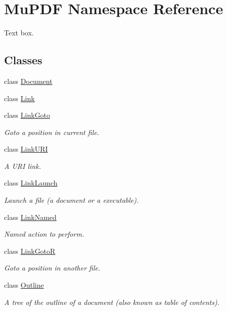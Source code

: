 \hypertarget{namespace_mu_p_d_f}{\section{Mu\-P\-D\-F Namespace Reference}
\label{namespace_mu_p_d_f}
}


Text box.  


\subsection*{Classes}
\begin{DoxyCompactItemize}
\item 
class \hyperlink{class_mu_p_d_f_1_1_document}{Document}
\item 
class \hyperlink{class_mu_p_d_f_1_1_link}{Link}
\item 
class \hyperlink{class_mu_p_d_f_1_1_link_goto}{Link\-Goto}
\begin{DoxyCompactList}\small\item\em Goto a position in current file. \end{DoxyCompactList}\item 
class \hyperlink{class_mu_p_d_f_1_1_link_u_r_i}{Link\-U\-R\-I}
\begin{DoxyCompactList}\small\item\em A U\-R\-I link. \end{DoxyCompactList}\item 
class \hyperlink{class_mu_p_d_f_1_1_link_launch}{Link\-Launch}
\begin{DoxyCompactList}\small\item\em Launch a file (a document or a executable). \end{DoxyCompactList}\item 
class \hyperlink{class_mu_p_d_f_1_1_link_named}{Link\-Named}
\begin{DoxyCompactList}\small\item\em Named action to perform. \end{DoxyCompactList}\item 
class \hyperlink{class_mu_p_d_f_1_1_link_goto_r}{Link\-Goto\-R}
\begin{DoxyCompactList}\small\item\em Goto a position in another file. \end{DoxyCompactList}\item 
class \hyperlink{class_mu_p_d_f_1_1_outline}{Outline}
\begin{DoxyCompactList}\small\item\em A tree of the outline of a document (also known as table of contents). \end{DoxyCompactList}\item 

\end{DoxyCompactItemize}
